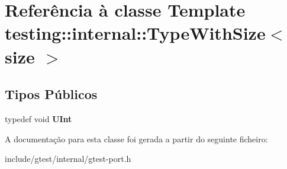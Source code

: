 \hypertarget{classtesting_1_1internal_1_1TypeWithSize}{\section{Referência à classe Template testing\-:\-:internal\-:\-:Type\-With\-Size$<$ size $>$}
\label{classtesting_1_1internal_1_1TypeWithSize}
}
\subsection*{Tipos Públicos}
\begin{DoxyCompactItemize}
\item 
\hypertarget{classtesting_1_1internal_1_1TypeWithSize_a3898640d9f6c1e18110eef90f47a5d7b}{typedef void {\bfseries U\-Int}}\label{classtesting_1_1internal_1_1TypeWithSize_a3898640d9f6c1e18110eef90f47a5d7b}

\end{DoxyCompactItemize}


A documentação para esta classe foi gerada a partir do seguinte ficheiro\-:\begin{DoxyCompactItemize}
\item 
include/gtest/internal/gtest-\/port.\-h\end{DoxyCompactItemize}
